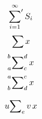\documentclass{article}
\begin{document}
\[ \sideset{}{'}\sum_{i=1}^\infty S_i \]
\[  \sideset{}{}{\sum} x\]
\[  \sideset{_a^b}{_c^d}{\sum} x\]
\[  \sideset{^a_b}{^c_d}{\sum} x\]

\[  \sideset{u}{_ev}{\sum} x\]
\end{document}
